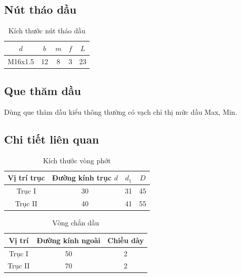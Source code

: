 \documentclass[12pt,a4paper]{report}
\begin{document}
\subsection{Nút tháo dầu}
\begin{table}[H]
    \centering
    \caption{Kích thước nút tháo dầu}
    \label{tab:5.7}
    \begin{tabular}{|c|c|c|c|c|}
        \hline
        $d$ & $b$ & $m$ & $f$ & $L$ \\
        \hline
        M16x1.5 & 12 & 8 & 3 & 23 \\
        \hline
    \end{tabular}
\end{table}

\subsection{Que thăm dầu}
Dùng que thăm dầu kiểu thông thường có vạch chỉ thị mức dầu Max, Min.

\subsection{Chi tiết liên quan}
\begin{table}[H]
    \centering
    \caption{Kích thước vòng phớt}
    \label{tab:5.8}
    \begin{tabular}{|c|c|c|c|}
        \hline
        Vị trí trục & Đường kính trục $d$ & $d_1$ & $D$ \\
        \hline
        Trục I & 30 & 31 & 45 \\
        Trục II & 40 & 41 & 55 \\
        \hline
    \end{tabular}
\end{table}

\begin{table}[H]
    \centering
    \caption{Vòng chắn dầu}
    \label{tab:5.9}
    \begin{tabular}{|c|c|c|}
        \hline
        Vị trí & Đường kính ngoài & Chiều dày \\
        \hline
        Trục I & 50 & 2 \\
        Trục II & 70 & 2 \\
        \hline
    \end{tabular}
\end{table}
\end{document}
